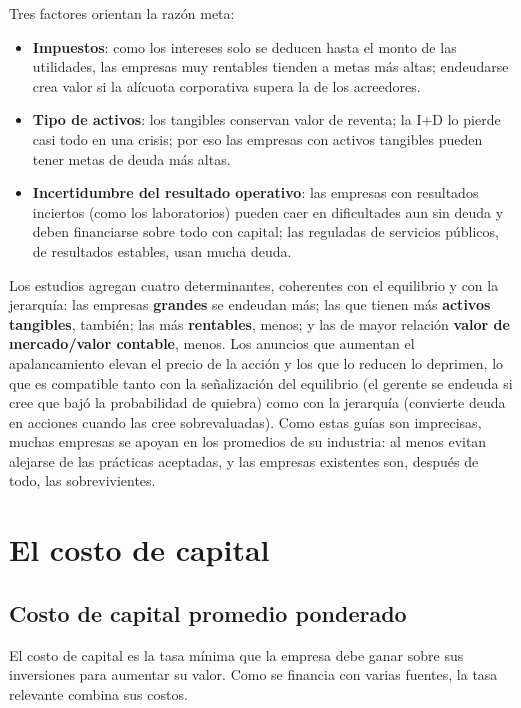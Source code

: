 Tres factores orientan la razón meta:
\begin{itemize}
\item \textbf{Impuestos}: como los intereses solo se deducen hasta el monto de las utilidades, las empresas muy rentables tienden a metas más altas; endeudarse crea valor si la alícuota corporativa supera la de los acreedores.
\item \textbf{Tipo de activos}: los tangibles conservan valor de reventa; la I+D lo pierde casi todo en una crisis; por eso las empresas con activos tangibles pueden tener metas de deuda más altas.
\item \textbf{Incertidumbre del resultado operativo}: las empresas con resultados inciertos (como los laboratorios) pueden caer en dificultades aun sin deuda y deben financiarse sobre todo con capital; las reguladas de servicios públicos, de resultados estables, usan mucha deuda.
\end{itemize}

Los estudios agregan cuatro determinantes, coherentes con el equilibrio y con la jerarquía: las empresas \textbf{grandes} se endeudan más; las que tienen más \textbf{activos tangibles}, también; las más \textbf{rentables}, menos; y las de mayor relación \textbf{valor de mercado/valor contable}, menos. Los anuncios que aumentan el apalancamiento elevan el precio de la acción y los que lo reducen lo deprimen, lo que es compatible tanto con la señalización del equilibrio (el gerente se endeuda si cree que bajó la probabilidad de quiebra) como con la jerarquía (convierte deuda en acciones cuando las cree sobrevaluadas). Como estas guías son imprecisas, muchas empresas se apoyan en los promedios de su industria: al menos evitan alejarse de las prácticas aceptadas, y las empresas existentes son, después de todo, las sobrevivientes.

\section{El costo de capital}\label{sec:u3-ccpp}

\subsection{Costo de capital promedio ponderado}

El costo de capital es la tasa mínima que la empresa debe ganar sobre sus inversiones para aumentar su valor. Como se financia con varias fuentes, la tasa relevante combina sus costos.

